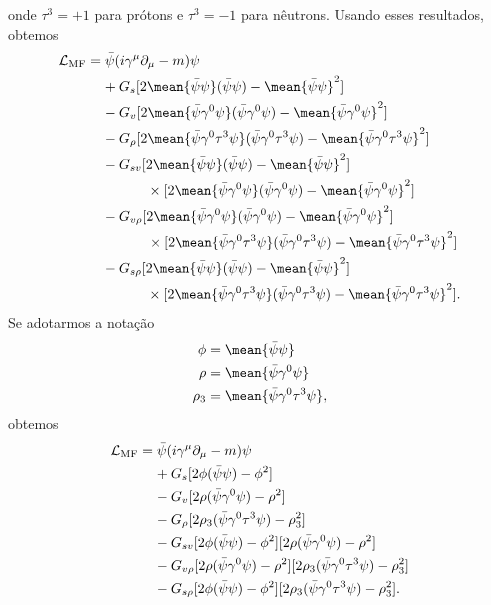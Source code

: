 %
onde $\tau^3 = + 1$ para prótons e $\tau^3 = -1$ para nêutrons. Usando esses resultados, obtemos
\begin{equation}
\begin{split}
\mathcal{L}_{\rm{MF}} &= \bar{\psi}(i\gamma^\mu\partial_\mu - m)\psi \\
&\phantom{=~} + G_s [2\mean{\bar\psi\psi}(\bar\psi\psi) - \mean{\bar\psi\psi}^2] \\
&\phantom{=~} - G_v [2\mean{\bar\psi\gamma^0\psi}(\bar\psi\gamma^0\psi) - \mean{\bar\psi\gamma^0\psi}^2] \\
&\phantom{=~} - G_\rho[2\mean{\bar\psi\gamma^0\tau^3\psi}(\bar\psi\gamma^0\tau^3\psi) - \mean{\bar\psi\gamma^0\tau^3\psi}^2] \\
&\phantom{=~} - G_{sv}[2\mean{\bar\psi\psi}(\bar\psi\psi) - \mean{\bar\psi\psi}^2]\\
&\phantom{=~ - 2 G_{sv}} \times [2\mean{\bar\psi\gamma^0\psi}(\bar\psi\gamma^0\psi) - \mean{\bar\psi\gamma^0\psi}^2] \\
&\phantom{=~} - G_{v\rho} [2\mean{\bar\psi\gamma^0\psi}(\bar\psi\gamma^0\psi) - \mean{\bar\psi\gamma^0\psi}^2] \\
&\phantom{=~ - 2 G_{v\rho}} \times [2\mean{\bar\psi\gamma^0\tau^3\psi}(\bar\psi\gamma^0\tau^3\psi) - \mean{\bar\psi\gamma^0\tau^3\psi}^2] \\
&\phantom{=~} - G_{s\rho}[2\mean{\bar\psi\psi}(\bar\psi\psi) - \mean{\bar\psi\psi}^2]\\
&\phantom{=~ - 2 G_{s\rho}} \times [2\mean{\bar\psi\gamma^0\tau^3\psi}(\bar\psi\gamma^0\tau^3\psi) - \mean{\bar\psi\gamma^0\tau^3\psi}^2].
\end{split}
\end{equation}
%
Se adotarmos a notação
\begin{align}
    \phi &= \mean{\bar\psi\psi} \\
    \rho &= \mean{\bar\psi\gamma^0\psi} \\
    \rho_3 &= \mean{\bar\psi\gamma^0\tau^3\psi},
\end{align}
%
obtemos
\begin{equation}
\begin{split}
\mathcal{L}_{\rm{MF}} &= \bar{\psi}(i\gamma^\mu\partial_\mu - m)\psi \\
&\phantom{=~} + G_s [2\phi(\bar\psi\psi) - \phi^2] \\
&\phantom{=~} - G_v [2\rho(\bar\psi\gamma^0\psi) - \rho^2] \\
&\phantom{=~} - G_\rho[2\rho_3(\bar\psi\gamma^0\tau^3\psi) - \rho_3^2] \\
&\phantom{=~} - G_{sv}[2\phi(\bar\psi\psi) - \phi^2] [2\rho(\bar\psi\gamma^0\psi) - \rho^2] \\
&\phantom{=~} - G_{v\rho} [2\rho(\bar\psi\gamma^0\psi) - \rho^2] [2\rho_3(\bar\psi\gamma^0\tau^3\psi) - \rho_3^2] \\
&\phantom{=~} - G_{s\rho}[2\phi(\bar\psi\psi) - \phi^2] [2\rho_3(\bar\psi\gamma^0\tau^3\psi) - \rho_3^2].
\end{split}
\end{equation}
